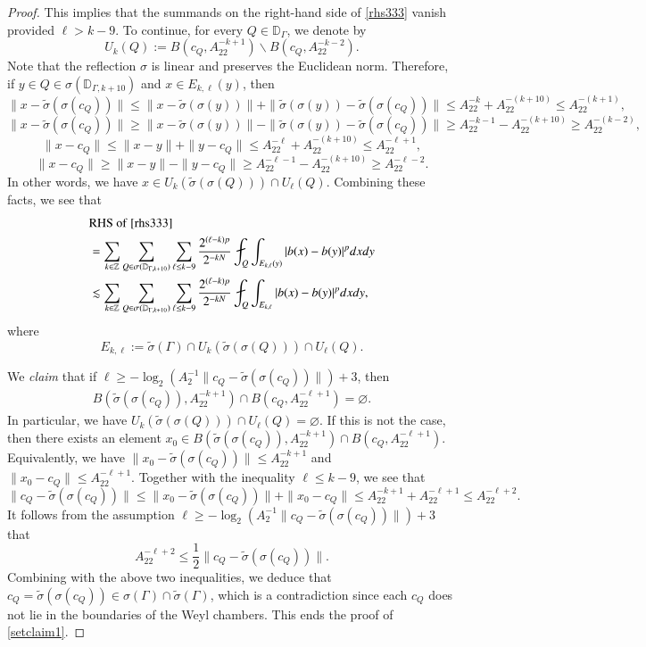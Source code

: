 \documentclass[12pt]{amsart}
\begin{document}
\begin{proof}
This implies that the summands on the right-hand side of \eqref{rhs333} vanish provided $\ell>k-9$. To continue, for every $Q\in \mathbb{D}_{\Gamma}$, we denote by $$U_k(Q):=B(c_Q,A_22^{-k+1})\backslash B(c_Q,A_22^{-k-2}).$$
Note that the reflection $\sigma$ is linear and preserves the Euclidean norm. Therefore, if $y\in Q\in\sigma(\mathbb{D}_{\Gamma,k+10})$ and $x\in E_{k,\ell}(y)$, then
$$\|x-\widetilde{\sigma}(\sigma(c_Q))\|\leq \|x-\widetilde{\sigma}(\sigma(y))\|+\|\widetilde{\sigma}(\sigma(y))-\widetilde{\sigma}(\sigma(c_Q))\|\leq A_22^{-k}+A_22^{-(k+10)}\leq A_22^{-(k+1)},$$
$$\|x-\widetilde{\sigma}(\sigma(c_Q))\|\geq \|x-\widetilde{\sigma}(\sigma(y))\|-\|\widetilde{\sigma}(\sigma(y))-\widetilde{\sigma}(\sigma(c_Q))\|\geq A_22^{-k-1}-A_22^{-(k+10)}\geq A_22^{-(k-2)},$$
$$\|x-c_Q\|\leq \|x-y\|+\|y-c_Q\|\leq A_22^{-\ell}+A_22^{-(k+10)}\leq A_22^{-\ell+1},$$
$$\|x-c_Q\|\geq \|x-y\|-\|y-c_Q\|\geq A_22^{-\ell-1}-A_22^{-(k+10)}\geq A_22^{-\ell-2}.$$
In other words, we have $x\in U_k(\widetilde{\sigma}(\sigma(Q)))\cap U_{\ell}(Q)$. Combining these facts, we see that
\begin{align}\label{rhs444}
&{\rm RHS}\ {\rm of}\ \eqref{rhs333}\nonumber\\
&=\sum_{k\in\mathbb{Z}}\sum_{Q\in\sigma(\mathbb{D}_{\Gamma,k+10})}\sum_{\ell\leq k-9}\frac{2^{(\ell-k)p}}{2^{-kN}}\fint_{Q}\int_{E_{k,\ell}(y)}|b(x)-b(y)|^pdxdy\nonumber\\
&\lesssim \sum_{k\in\mathbb{Z}}\sum_{Q\in\sigma(\mathbb{D}_{\Gamma,k+10})}\sum_{\ell\leq k-9}\frac{2^{(\ell-k)p}}{2^{-kN}}\fint_{Q}\int_{E_{k,\ell}}|b(x)-b(y)|^pdxdy,
\end{align}
where
$$E_{k,\ell}:=\widetilde{\sigma}(\Gamma)\cap U_k(\widetilde{\sigma}(\sigma(Q)))\cap U_{\ell}(Q).$$

We {\it claim} that if $\ell\geq -\log_2(A_2^{-1}\|c_Q-\widetilde{\sigma}(\sigma(c_Q))\|)+3$, then
\begin{align}\label{setclaim1}
B(\widetilde{\sigma}(\sigma(c_Q)),A_22^{-k+1})\cap B(c_Q,A_22^{-\ell+1})=\varnothing.
\end{align}
In particular, we have $U_k(\widetilde{\sigma}(\sigma(Q)))\cap U_{\ell}(Q)=\varnothing$. If this is not the case, then there exists an element $x_0\in B(\widetilde{\sigma}(\sigma(c_Q)),A_22^{-k+1})\cap B(c_Q,A_22^{-\ell+1})$. Equivalently, we have $\|x_0-\widetilde{\sigma}(\sigma(c_Q))\|\leq A_22^{-k+1}$ and $\|x_0-c_Q\|\leq A_22^{-\ell+1}$. Together with the inequality $\ell\leq k-9$, we see that
$$\|c_Q-\widetilde{\sigma}(\sigma(c_Q))\|\leq \|x_0-\widetilde{\sigma}(\sigma(c_Q))\|+\|x_0-c_Q\|\leq A_22^{-k+1}+A_22^{-\ell+1}\leq A_22^{-\ell+2}.$$
It follows from the assumption $\ell\geq -\log_2(A_2^{-1}\|c_Q-\widetilde{\sigma}(\sigma(c_Q))\|)+3$ that
$$A_22^{-\ell+2}\leq \frac{1}{2}\|c_Q-\widetilde{\sigma}(\sigma(c_Q))\|.$$
Combining with the above two inequalities, we deduce that $c_Q=\widetilde{\sigma}(\sigma(c_Q))\in \sigma(\Gamma)\cap \widetilde{\sigma}(\Gamma)$, which  is a contradiction since each $c_Q$ does not lie in the boundaries of the Weyl chambers. This ends the proof of  \eqref{setclaim1}.


\end{proof}
\end{document}
